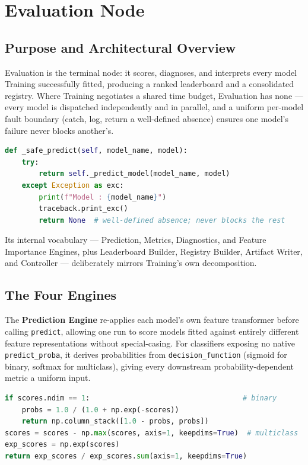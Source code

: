 \section{Evaluation Node}
\label{sec:impl-evaluation}

\subsection{Purpose and Architectural Overview}
\label{subsec:evaluation-overview}

Evaluation is the terminal node: it scores, diagnoses, and interprets every model Training successfully fitted, producing a ranked leaderboard and a consolidated registry. Where Training negotiates a shared time budget, Evaluation has none --- every model is dispatched independently and in parallel, and a uniform per-model fault boundary (catch, log, return a well-defined absence) ensures one model's failure never blocks another's.

\begin{lstlisting}[language=Python, caption={The uniform per-model fault boundary, as implemented in Prediction Engine.}, label={lst:evaluation-fault-boundary}]
def _safe_predict(self, model_name, model):
    try:
        return self._predict_model(model_name, model)
    except Exception as exc:
        print(f"Model : {model_name}")
        traceback.print_exc()
        return None  # well-defined absence; never blocks the rest
\end{lstlisting} Its internal vocabulary --- Prediction, Metrics, Diagnostics, and Feature Importance Engines, plus Leaderboard Builder, Registry Builder, Artifact Writer, and Controller --- deliberately mirrors Training's own decomposition.

\subsection{The Four Engines}
\label{subsec:evaluation-engines}

The \textbf{Prediction Engine} re-applies each model's own feature transformer before calling \texttt{predict}, allowing one run to score models fitted against entirely different feature representations without special-casing. For classifiers exposing no native \texttt{predict\_proba}, it derives probabilities from \texttt{decision\_function} (sigmoid for binary, softmax for multiclass), giving every downstream probability-dependent metric a uniform input.

\begin{lstlisting}[language=Python, caption={Probability fallback from \texttt{decision\_function}: sigmoid for binary, softmax for multiclass.}, label={lst:evaluation-proba-fallback}]
if scores.ndim == 1:                                    # binary
    probs = 1.0 / (1.0 + np.exp(-scores))
    return np.column_stack([1.0 - probs, probs])
scores = scores - np.max(scores, axis=1, keepdims=True)  # multiclass
exp_scores = np.exp(scores)
return exp_scores / exp_scores.sum(axis=1, keepdims=True)
\end{lstlisting}

